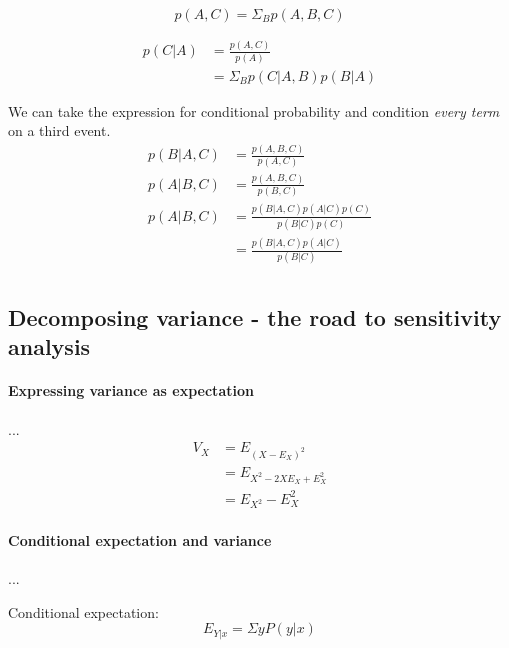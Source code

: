 \begin{equation}
    p(A, C) = \Sigma_B p(A, B, C)
\end{equation}

\begin{equation}
    \begin{aligned}
            p(C | A) &= \frac{p(A, C)}{p(A)} \\
                     &= \Sigma_B p(C|A, B) p(B|A)
    \end{aligned}
\end{equation}

We can take the expression for conditional probability and condition \emph{every term} on a third event.
\begin{equation}
    \begin{aligned}
        p(B|A, C) &= \frac{p(A, B, C)}{p(A, C)} \\
        p(A|B, C) &= \frac{p(A, B, C)}{p(B, C)} \\
        p(A|B, C) &= \frac{p(B|A, C) p(A|C) p(C)}{p(B|C)p(C)} \\
                  &= \frac{p(B|A, C) p(A|C)}{p(B|C)} \\
    \end{aligned}
\end{equation}


\subsection{Decomposing variance - the road to sensitivity analysis}

\paragraph{Expressing variance as expectation} ...
\begin{equation}
    \begin{aligned}
        V_X &= E_{ (X - E_X)^2 } \\
            &= E_{ X^2 - 2 X E_X + E_X^2 } \\
            &= E_{X^2} - E_X^2
    \end{aligned}
\end{equation}

\paragraph{Conditional expectation and variance} ...

\begin{definition} \label{conditionalExpectation}
    Conditional expectation:
    $$ E_{Y|x} = \Sigma y P(y|x) $$
\end{definition}

